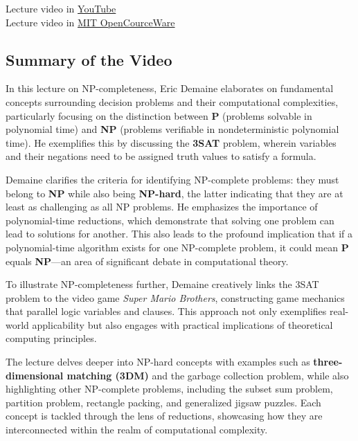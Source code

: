 \documentclass[letter, 12pt]{article}
\begin{document}
    Lecture video in  \href{https://www.youtube.com/watch?v=eHZifpgyH_4&t=66s}{YouTube} \\
    Lecture video in  \href{https://ocw.mit.edu/courses/6-046j-design-and-analysis-of-algorithms-spring-2015/resources/lecture-16-complexity-p-np-np-completeness-reductions/}{MIT OpenCourceWare}

    \subsection{Summary of the Video}
    In this lecture on NP-completeness, Eric Demaine elaborates on fundamental concepts surrounding decision problems and their computational complexities, particularly focusing on the distinction between \textbf{P} (problems solvable in polynomial time) and \textbf{NP} (problems verifiable in nondeterministic polynomial time). He exemplifies this by discussing the \textbf{3SAT} problem, wherein variables and their negations need to be assigned truth values to satisfy a formula.

    Demaine clarifies the criteria for identifying NP-complete problems: they must belong to \textbf{NP} while also being \textbf{NP-hard}, the latter indicating that they are at least as challenging as all NP problems. He emphasizes the importance of polynomial-time reductions, which demonstrate that solving one problem can lead to solutions for another. This also leads to the profound implication that if a polynomial-time algorithm exists for one NP-complete problem, it could mean \textbf{P} equals \textbf{NP}—an area of significant debate in computational theory.

    To illustrate NP-completeness further, Demaine creatively links the 3SAT problem to the video game \textit{Super Mario Brothers}, constructing game mechanics that parallel logic variables and clauses. This approach not only exemplifies real-world applicability but also engages with practical implications of theoretical computing principles.

    The lecture delves deeper into NP-hard concepts with examples such as \textbf{three-dimensional matching (3DM)} and the garbage collection problem, while also highlighting other NP-complete problems, including the subset sum problem, partition problem, rectangle packing, and generalized jigsaw puzzles. Each concept is tackled through the lens of reductions, showcasing how they are interconnected within the realm of computational complexity.
\end{document}
